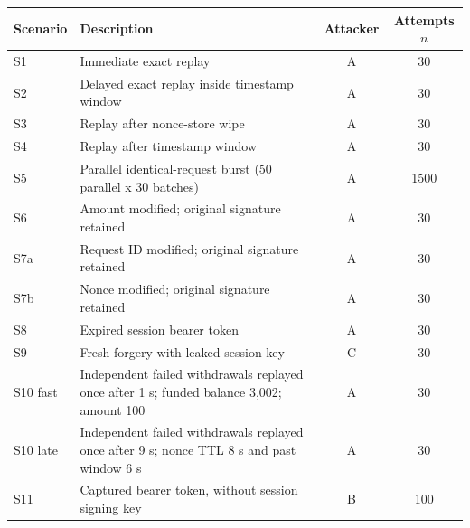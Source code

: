 \begin{table}[t]
\centering
\small
\begin{tabular}{lp{4.2in}cc}
\toprule
Scenario & Description & Attacker & Attempts $n$ \\
\midrule
S1 & Immediate exact replay & A & 30 \\
S2 & Delayed exact replay inside timestamp window & A & 30 \\
S3 & Replay after nonce-store wipe & A & 30 \\
S4 & Replay after timestamp window & A & 30 \\
S5 & Parallel identical-request burst (50 parallel x 30 batches) & A & 1500 \\
S6 & Amount modified; original signature retained & A & 30 \\
S7a & Request ID modified; original signature retained & A & 30 \\
S7b & Nonce modified; original signature retained & A & 30 \\
S8 & Expired session bearer token & A & 30 \\
S9 & Fresh forgery with leaked session key & C & 30 \\
S10 fast & Independent failed withdrawals replayed once after 1 s; funded balance 3,002; amount 100 & A & 30 \\
S10 late & Independent failed withdrawals replayed once after 9 s; nonce TTL 8 s and past window 6 s & A & 30 \\
S11 & Captured bearer token, without session signing key & B & 100 \\
\bottomrule
\end{tabular}
\end{table}
